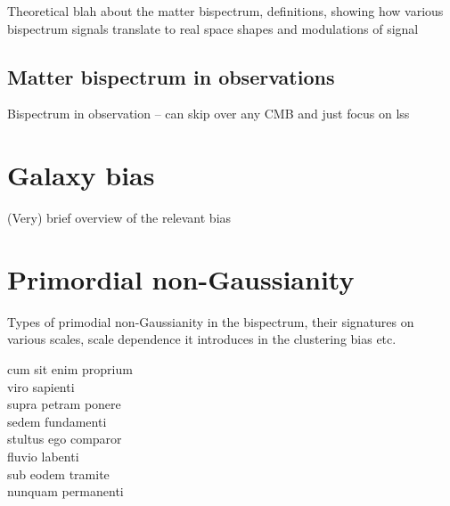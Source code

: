 Theoretical blah about the matter bispectrum, definitions, showing how various bispectrum signals translate to real space shapes and modulations of signal

\subsection{Matter bispectrum in observations}

Bispectrum in observation -- can skip over any CMB and just focus on lss

\section{Galaxy bias}


(Very) brief overview of the relevant bias


\section{Primordial non-Gaussianity}

Types of primodial non-Gaussianity in the bispectrum, their signatures on various scales, scale dependence it introduces in the clustering bias etc. 


cum sit enim proprium \\
viro sapienti \\
supra petram ponere \\
sedem fundamenti \\
stultus ego comparor \\
fluvio labenti \\
sub eodem tramite \\
nunquam permanenti 